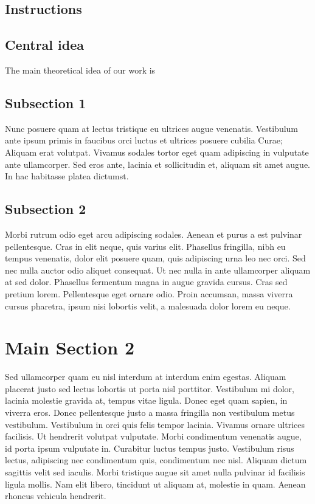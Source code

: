 \subsection{Instructions} 

\subsection{Central idea}
The main theoretical idea of our work is
\subsection{Subsection 1}

Nunc posuere quam at lectus tristique eu ultrices augue venenatis. Vestibulum ante ipsum primis in faucibus orci luctus et ultrices posuere cubilia Curae; Aliquam erat volutpat. Vivamus sodales tortor eget quam adipiscing in vulputate ante ullamcorper. Sed eros ante, lacinia et sollicitudin et, aliquam sit amet augue. In hac habitasse platea dictumst.


\subsection{Subsection 2}
Morbi rutrum odio eget arcu adipiscing sodales. Aenean et purus a est pulvinar pellentesque. Cras in elit neque, quis varius elit. Phasellus fringilla, nibh eu tempus venenatis, dolor elit posuere quam, quis adipiscing urna leo nec orci. Sed nec nulla auctor odio aliquet consequat. Ut nec nulla in ante ullamcorper aliquam at sed dolor. Phasellus fermentum magna in augue gravida cursus. Cras sed pretium lorem. Pellentesque eget ornare odio. Proin accumsan, massa viverra cursus pharetra, ipsum nisi lobortis velit, a malesuada dolor lorem eu neque.


\section{Main Section 2}

Sed ullamcorper quam eu nisl interdum at interdum enim egestas. Aliquam placerat justo sed lectus lobortis ut porta nisl porttitor. Vestibulum mi dolor, lacinia molestie gravida at, tempus vitae ligula. Donec eget quam sapien, in viverra eros. Donec pellentesque justo a massa fringilla non vestibulum metus vestibulum. Vestibulum in orci quis felis tempor lacinia. Vivamus ornare ultrices facilisis. Ut hendrerit volutpat vulputate. Morbi condimentum venenatis augue, id porta ipsum vulputate in. Curabitur luctus tempus justo. Vestibulum risus lectus, adipiscing nec condimentum quis, condimentum nec nisl. Aliquam dictum sagittis velit sed iaculis. Morbi tristique augue sit amet nulla pulvinar id facilisis ligula mollis. Nam elit libero, tincidunt ut aliquam at, molestie in quam. Aenean rhoncus vehicula hendrerit.